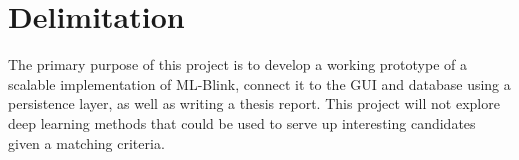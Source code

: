 \section{Delimitation}

The primary purpose of this project is to develop a working prototype of a scalable implementation of ML-Blink, connect it to the GUI and database using a persistence layer, as well as writing a thesis report. This project will not explore deep learning methods that could be used to serve up interesting candidates given a matching criteria.